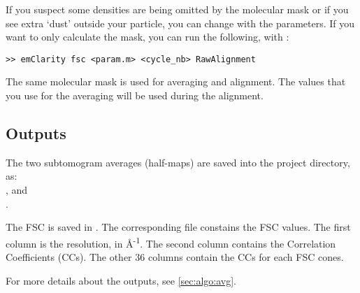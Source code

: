If you suspect some densities are being omitted by the molecular mask or if you see extra `dust' outside your particle, you can change with the  parameters. If you want to only calculate the mask, you can run the following, with :
\begin{lstlisting}
>> emClarity fsc <param.m> <cycle_nb> RawAlignment
\end{lstlisting}
The same molecular mask is used for averaging and alignment. The values that you use for the averaging will be used during the alignment.

\newpage
\subsection{Outputs}

The two subtomogram averages (half-maps) are saved into the project directory, as:\\ , and\\ .

The FSC is saved in . The corresponding  file constains the FSC values. The first column is the resolution, in \r{A}\textsuperscript{-1}. The second column contains the Correlation Coefficients (CCs). The other 36 columns contain the CCs for each FSC cones.

For more details about the outputs, see \ref{sec:algo:avg}.
